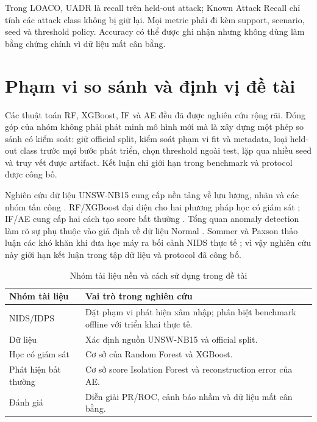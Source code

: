 \documentclass[12pt,a4paper,oneside]{report}
\begin{document}
Trong LOACO, UADR là recall trên held-out attack; Known Attack Recall chỉ tính các attack class không bị giữ lại. Mọi metric phải đi kèm support, scenario, seed và threshold policy. Accuracy có thể được ghi nhận nhưng không dùng làm bằng chứng chính vì dữ liệu mất cân bằng.

\section{Phạm vi so sánh và định vị đề tài}

Các thuật toán RF, XGBoost, IF và AE đều đã được nghiên cứu rộng rãi. Đóng góp của nhóm không phải phát minh mô hình mới mà là xây dựng một phép so sánh có kiểm soát: giữ official split, kiểm soát phạm vi fit và metadata, loại held-out class trước mọi bước phát triển, chọn threshold ngoài test, lặp qua nhiều seed và truy vết được artifact. Kết luận chỉ giới hạn trong benchmark và protocol được công bố.


Nghiên cứu dữ liệu UNSW-NB15 cung cấp nền tảng về lưu lượng, nhãn và các nhóm tấn công \cite{moustafa2015,moustafa2016}. RF/XGBoost đại diện cho hai phương pháp học có giám sát \cite{breiman2001,chen2016}; IF/AE cung cấp hai cách tạo score bất thường \cite{liu2008,sakurada2014}. Tổng quan anomaly detection làm rõ sự phụ thuộc vào giả định về dữ liệu Normal \cite{chandola2009}. Sommer và Paxson thảo luận các khó khăn khi đưa học máy ra bối cảnh NIDS thực tế \cite{sommer2010}; vì vậy nghiên cứu này giới hạn kết luận trong tập dữ liệu và protocol đã công bố.

\begin{table}[H]\centering\small
\caption{Nhóm tài liệu nền và cách sử dụng trong đề tài}
\begin{tabularx}{\textwidth}{L{4.7cm}Y}\toprule
Nhóm tài liệu & Vai trò trong nghiên cứu\\\midrule
NIDS/IDPS \cite{nist80094,sommer2010} & Đặt phạm vi phát hiện xâm nhập; phân biệt benchmark offline với triển khai thực tế.\\
Dữ liệu \cite{moustafa2015,moustafa2016,unswsite} & Xác định nguồn UNSW-NB15 và official split.\\
Học có giám sát \cite{breiman2001,chen2016} & Cơ sở của Random Forest và XGBoost.\\
Phát hiện bất thường \cite{liu2008,sakurada2014,chandola2009} & Cơ sở score Isolation Forest và reconstruction error của AE.\\
Đánh giá \cite{saito2015,davis2006,fawcett2006} & Diễn giải PR/ROC, cảnh báo nhầm và dữ liệu mất cân bằng.\\
\bottomrule\end{tabularx}\end{table}
\end{document}
